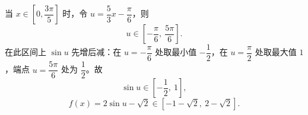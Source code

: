 \begin{answer}
当 $x\in\left[0,\dfrac{3\pi}{5}\right]$ 时，令 $u=\dfrac53x-\dfrac\pi6$，则
\nopagebreak[4]
\[u\in\left[-\frac\pi6,\ \frac{5\pi}{6}\right].\]
在此区间上 $\sin u$ 先增后减：在 $u=-\dfrac\pi6$ 处取最小值 $-\dfrac12$，在 $u=\dfrac\pi2$ 处取最大值 $1$，端点 $u=\dfrac{5\pi}6$ 处为 $\dfrac12$。故
\nopagebreak[4]
\[\sin u\in\left[-\frac12,\ 1\right],\]
\nopagebreak[4]
\[f(x)=2\sin u-\sqrt2\in\left[-1-\sqrt2,\ 2-\sqrt2\right].\]



\end{answer}
